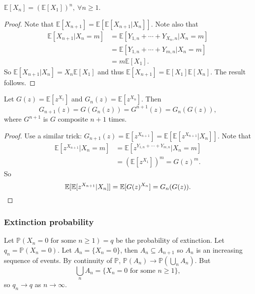 \begin{theorem}
    $ \mathbb{E}[X_n] = (\mathbb{E}[X_1])^n,\ \forall n\ge 1 $.
\end{theorem}
\begin{proof}
    Note that $ \mathbb{E}[X_{n+1}]=\mathbb{E}[\mathbb{E}[X_{n+1}|X_n]] $. Note also that 
    \begin{align*}
        \mathbb{E}[X_{n+1}|X_n=m] &= \mathbb{E}[Y_{1,n}+\cdots +Y_{X_n,n}|X_n=m]\\ 
        &= \mathbb{E}[Y_{1,n}+\cdots +Y_{m,n}|X_n=m]\\ 
        &= m\mathbb{E}[X_1].
    \end{align*}
    So $ \mathbb{E}[X_{n+1}|X_n] = X_n\mathbb{E}[X_1] $ and thus $ \mathbb{E}[X_{n+1}]=\mathbb{E}[X_1]\mathbb{E}[X_n] $. The result follows.
\end{proof}
\begin{theorem}
    Let $ G(z) = \mathbb{E}[z^{X_1}] $ and $ G_n(z)=\mathbb{E}[z^{X_n}] $. Then 
    \[
        G_{n+1}(z) = G(G_n(z)) = G^{n+1}(z)=G_n(G(z)),
    \]
    where $G^{n+1}$ is $G$ composite $n+1$ times.
\end{theorem}
\begin{proof}
    Use a similar trick: $ G_{n+1}(z) = \mathbb{E}[z^{X_{n+1}}]=\mathbb{E}[\mathbb{E}[z^{X_{n+1}}|X_n]] $. Note that 
    \begin{align*}
        \mathbb{E}[z^{X_{n+1}}|X_n=m] &= \mathbb{E}\left[ z^{Y_{1,n}+\cdots+Y_{m,n}}|X_n=m \right]\\ 
        &= \left( \mathbb{E}[z^{X_1}] \right)^m = G(z)^m.
    \end{align*}
    So 
    \[
        \mathbb{E}[\mathbb{E}[z^{X_{n+1}}|X_n]] = \mathbb{E}[G(z)^{X_n}] = G_n(G(z)).\qedhere
    \]
\end{proof}

\subsubsection*{Extinction probability} 
Let $ \mathbb{P}(X_n=0 \text{ for some }n\ge 1)=q $ be the probability of extinction. Let $ q_n=\mathbb{P}(X_n=0) $. Let $ A_n=\{X_n=0\} $, then $ A_n \subseteq A_{n+1} $ so $A_n$ is an increasing sequence of events. By continuity of $\mathbb{P}$, $ \mathbb{P}(A_n) \to \mathbb{P}\left( \bigcup_{n} A_n \right) $. But 
\[
    \bigcup_{n} A_n = \{X_n=0\text{ for some }n\ge 1\},
\]
so $ q_n\to q $ as $n\to \infty$.

